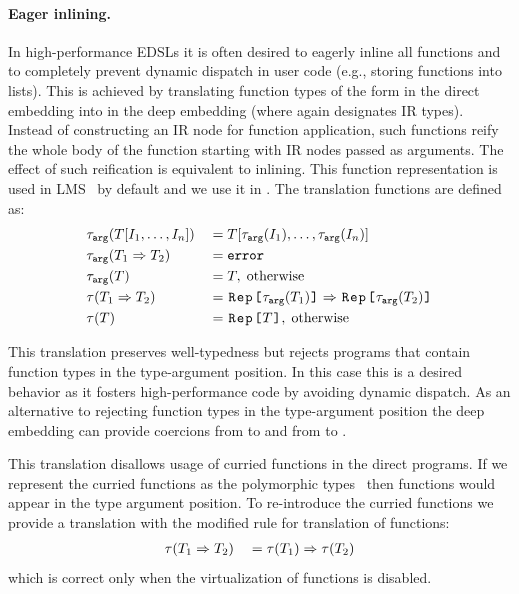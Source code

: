 \paragraph{Eager inlining.} In high-performance EDSLs it is often desired to
eagerly inline all functions and to completely prevent dynamic dispatch in
user code (e.g., storing functions into lists).  This is achieved by translating
function types of the form  in the direct embedding into
 in the deep embedding (where  again
designates IR types). Instead of constructing an IR node for function application, such functions reify the
whole body of the function starting with IR nodes passed as arguments. The effect of such
reification is equivalent to inlining. This function representation is used in LMS~\cite{rompf_lightweight_2012} by default
and we use it in . The translation functions are defined as:
\renewcommand*{\mathellipsis}{%
  \mathinner{{\ldotp}{\ldotp}{\ldotp}}%
}
\begin{alignat*}{3}
&\ttarg[T\lbrack I_1,\ldots,I_n \rbrack]   & \; = \; & T[\ttarg[I_1],\ldots,\ttarg[I_n]] \\
&\ttarg[T_1 \Rightarrow T_2] & \; = \; & \mathtt{error} \\
&\ttarg[T] & \; = \; & T, \; \text{otherwise} \\ %
&\ttother[T_1 \Rightarrow T_2] & \; = \; & \text{\code{Rep[}}\ttarg[T_1]\text{\code{]}} \Rightarrow \text{\code{Rep[}}\ttarg[T_2]\text{\code{]}}\\
&\ttother[T] & \; = \; & \text{\code{Rep[}} T \text{\code{]}},
\; \text{otherwise}
\end{alignat*} %

This translation preserves well-typedness but rejects programs that contain
function types in the type-argument position. In this case this is a desired
behavior as it fosters high-performance code by avoiding dynamic dispatch. As an alternative to rejecting function types in the type-argument position the deep embedding can provide
coercions from  to  and from  to .

This translation disallows usage of curried functions in the direct programs. If we
represent the curried functions as the polymorphic types~ then
functions would appear in the type argument position. To re-introduce the curried functions we
provide a translation with the modified rule for translation of functions:
\begin{alignat*}{3}
&\ttother[T_1 \Rightarrow T_2] & \; = \; & \ttother[T_1] \Rightarrow \ttother[T_2]\\
\end{alignat*} %
which is correct only when the virtualization of functions is disabled.

